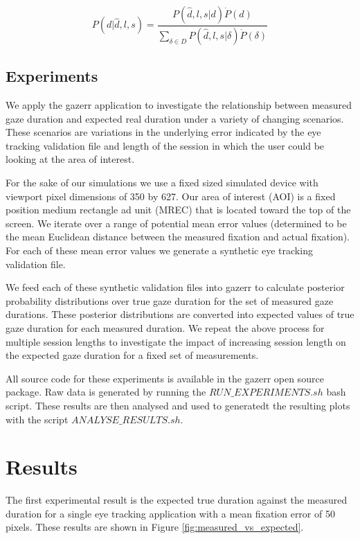 \documentclass[12pt,a4paper]{article}
\numberwithin{equation}{section}
\begin{document}
\begin{equation}
\label{eq:p_of_d_full}
P(d|\hat{d},l,s) =  \frac{ P(\hat{d},l,s|d) \dot P(d) }{ \sum_{\delta \in D} P(\hat{d},l,s|\delta) \dot P(\delta)  }
\end{equation}

\subsection{Experiments}

We apply the gazerr application to investigate the relationship between measured gaze duration
and expected real duration under a variety of changing scenarios. These scenarios are variations
in the underlying error indicated by the eye tracking validation file and length of the session
in which the user could be looking at the area of interest.

For the sake of our simulations we use a fixed sized simulated device with viewport pixel 
dimensions of 350 by 627. Our area of interest (AOI) is a fixed position medium rectangle ad unit (MREC)
that is located toward the top of the screen. We iterate over a range of potential mean error
values (determined to be the mean Euclidean distance between the measured fixation and actual fixation).
For each of these mean error values we generate a synthetic eye tracking validation file.

We feed each of these synthetic validation files into gazerr to calculate posterior probability
distributions over true gaze duration for the set of measured gaze durations. These posterior
distributions are converted into expected values of true gaze duration for each measured duration.
We repeat the above process for multiple session lengths to investigate the impact of increasing
session length on the expected gaze duration for a fixed set of measurements.

All source code for these experiments is available in the gazerr open source package. 
Raw data is generated by running the $RUN\_EXPERIMENTS.sh$ bash script. These results
are then analysed and used to generatedt the resulting plots with the script 
$ANALYSE\_RESULTS.sh$.

\section{Results}

The first experimental result is the expected true duration against the measured duration
for a single eye tracking application with a mean fixation error of 50 pixels. These
results are shown in Figure \ref{fig:measured_vs_expected}.
\end{document}
